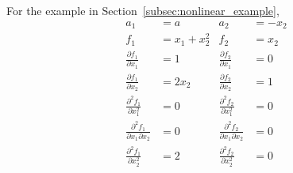 \documentclass[12pt]{article}
\begin{document}
For the example in Section~\ref{subsec:nonlinear_example}, 
\begin{equation}
\begin{aligned}
a_1 &= a 
&
a_2 &= -x_2
\\
f_1 &= x_1 + x_2^2 
&
f_2 &= x_2 
\\
\frac{\partial f_1}{\partial x_1} &= 1
&
\frac{\partial f_2}{\partial x_1} &= 0 
\\
\frac{\partial f_1}{\partial x_2} &= 2 x_2
&
\frac{\partial f_2}{\partial x_2} &= 1 
\\
\frac{\partial^2 f_1}{\partial x_1^2} &= 0
&
\frac{\partial^2 f_2}{\partial x_1^2} &= 0
\\
\frac{\partial^2 f_1}{\partial x_1 \partial x_2} &= 0
&
\frac{\partial^2 f_2}{\partial x_1 \partial x_2} &= 0
\\
\frac{\partial^2 f_1}{\partial x_2^2 } &= 2
&
\frac{\partial^2 f_2}{\partial x_2^2} &= 0
\end{aligned}
\end{equation}
\end{document}
